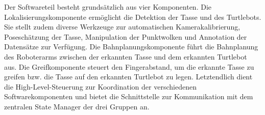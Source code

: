 Der Softwareteil besteht grundsätzlich aus vier Komponenten. Die Lokalisierungskomponente ermöglicht die Detektion der Tasse und des Turtlebots. Sie stellt zudem diverse Werkzeuge zur automatischen Kamerakalibrierung, Poseschätzung der Tasse, Manipulation der Punktwolken und  Annotation der Datensätze zur Verfügung. Die Bahnplanungskomponente führt die Bahnplanung des Roboterarms zwischen der erkannten Tasse und dem erkannten Turtlebot aus. Die Greifkomponente steuert den Fingerabstand, um die erkannte Tasse zu greifen bzw. die Tasse auf den erkannten Turtlebot zu legen. Letztendlich dient die High-Level-Steuerung zur Koordination der verschiedenen Softwarekomponenten und bietet die Schnittstelle zur Kommunikation mit dem zentralen State Manager der drei Gruppen an.\\
